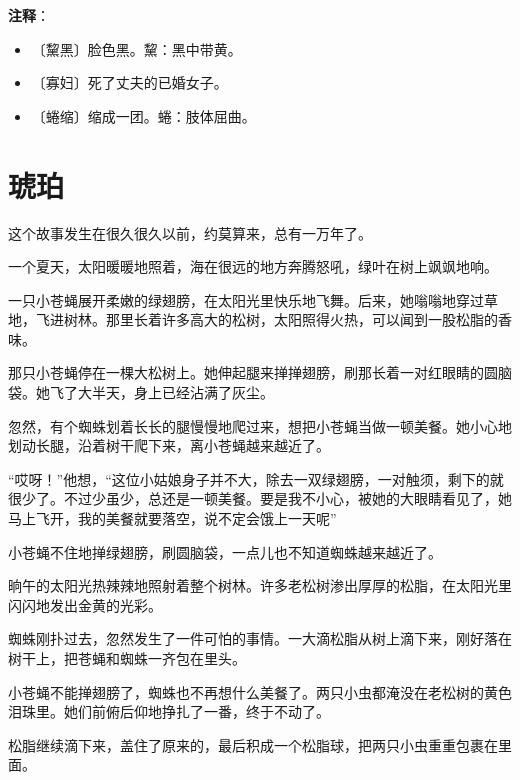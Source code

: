 \documentclass[12pt,UTF-8,openany]{ctexbook}
\begin{document}
\newpage

\textbf{注释}：

\vspace{-1em}

\begin{itemize}
    \setlength\itemsep{-0.2em}
    \item 〔黧黑〕脸色黑。黧：黑中带黄。
    \item 〔寡妇〕死了丈夫的已婚女子。
    \item 〔蜷缩〕缩成一团。蜷：肢体屈曲。
\end{itemize}

\chapter{琥珀}

\begin{large}
    
    这个故事发生在很久很久以前，约莫算来，总有一万年了。
    
    一个夏天，太阳暖暖地照着，海在很远的地方奔腾怒吼，绿叶在树上飒飒地响。
    
    一只小苍蝇展开柔嫩的绿翅膀，在太阳光里快乐地飞舞。后来，她嗡嗡地穿过草地，飞进树林。那里长着许多高大的松树，太阳照得火热，可以闻到一股松脂的香味。
    
    那只小苍蝇停在一棵大松树上。她伸起腿来掸掸翅膀，刷那长着一对红眼睛的圆脑袋。她飞了大半天，身上已经沾满了灰尘。
    
    忽然，有个蜘蛛划着长长的腿慢慢地爬过来，想把小苍蝇当做一顿美餐。她小心地划动长腿，沿着树干爬下来，离小苍蝇越来越近了。
    
    “哎呀！”他想，“这位小姑娘身子并不大，除去一双绿翅膀，一对触须，剩下的就很少了。不过少虽少，总还是一顿美餐。要是我不小心，被她的大眼睛看见了，她马上飞开，我的美餐就要落空，说不定会饿上一天呢”
    
    小苍蝇不住地掸绿翅膀，刷圆脑袋，一点儿也不知道蜘蛛越来越近了。
    
    晌午的太阳光热辣辣地照射着整个树林。许多老松树渗出厚厚的松脂，在太阳光里闪闪地发出金黄的光彩。
    
    蜘蛛刚扑过去，忽然发生了一件可怕的事情。一大滴松脂从树上滴下来，刚好落在树干上，把苍蝇和蜘蛛一齐包在里头。
    
    小苍蝇不能掸翅膀了，蜘蛛也不再想什么美餐了。两只小虫都淹没在老松树的黄色泪珠里。她们前俯后仰地挣扎了一番，终于不动了。
    
    松脂继续滴下来，盖住了原来的，最后积成一个松脂球，把两只小虫重重包裹在里面。
    

\end{large}
\end{document}
